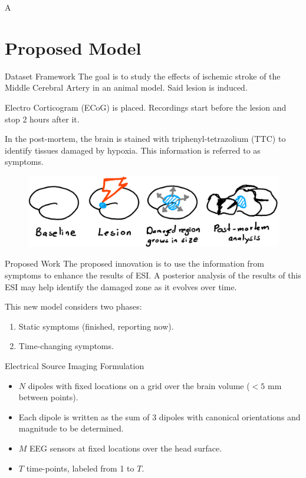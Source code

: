 \documentclass[progressbar=head]{beamer}
\begin{document}
\begin{frame}{A}

\end{frame}

{
\section{Proposed Model}
}

\begin{frame}{Dataset Framework}
The goal is to study the effects of
ischemic stroke of the Middle Cerebral Artery in an animal
model. 
Said lesion is induced.

Electro Corticogram (ECoG) is placed. Recordings start before the lesion and stop 2 hours after it.

In the post-mortem, the brain is stained with
triphenyl-tetrazolium (TTC)
to identify tissues damaged by hypoxia. This information is referred to as \alert{symptoms}.

\begin{figure}
\centering
\includegraphics[width=0.8\linewidth]{./img_oldbeamer/sketch01_v2}
\end{figure}
\end{frame}

\begin{frame}{Proposed Work}
The proposed innovation is to use the information from {symptoms} to enhance the results of ESI.
%
A posterior analysis of the results of this ESI may help identify the damaged zone as it evolves over time.

This new model considers two phases:
\begin{enumerate}
    \item Static symptoms (finished, reporting now).
    \item Time-changing symptoms.
\end{enumerate}
\end{frame}



\begin{frame}{Electrical Source Imaging Formulation}
\begin{itemize}
    \item $N$ dipoles with fixed locations on a grid over the brain volume ($<5$ mm between points).
    \item Each dipole is written as the sum of 3 dipoles with canonical orientations and magnitude to be determined.
    \item $M$ EEG sensors at fixed locations over the head surface.
    \item $T$ time-points, labeled from 1 to $T$.
\end{itemize}
\end{frame}
\end{document}
